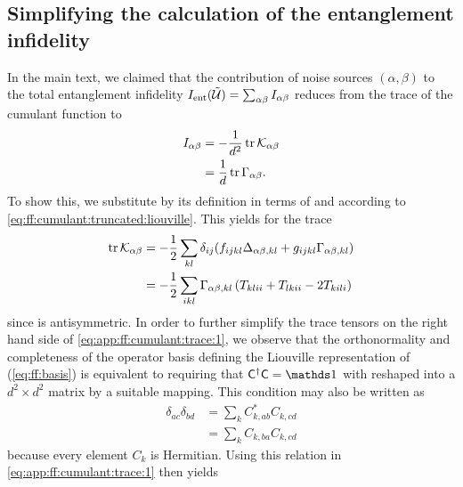 \subsection{Simplifying the calculation of the entanglement infidelity}\label{subsec:app:ff:derivations:fidelity}
In the main text, we claimed that the contribution of noise sources $(\alpha,\beta)$ to the total entanglement infidelity $I_{\mathrm{ent}}(\mathcal{\tilde{U}}) = \sum_{\alpha\beta}I_{\alpha\beta}$ reduces from the trace of the cumulant function \cumulantfun to
\begin{align}
    I_{\alpha\beta} &= -\frac{1}{d^2}\tr\mathcal{K}_{\alpha\beta} \label{eq:app:ff:infid} \\
                         &= \frac{1}{d}\tr\Gamma_{\alpha\beta}.
\end{align}
To show this, we substitute \cumulantfun by its definition in terms of \freqshifts and \decayamps according to \cref{eq:ff:cumulant:truncated:liouville}.
This yields for the trace
\begin{equation}\label{eq:app:ff:cumulant:trace:1}
    \begin{split}
        \tr\mathcal{K}_{\alpha\beta} &= -\frac{1}{2}\sum_{kl}\delta_{ij}(f_{ijkl}\Delta_{\alpha\beta,kl} + g_{ijkl}\Gamma_{\alpha\beta,kl}) \\
                                      &= -\frac{1}{2}\sum_{ikl}\Gamma_{\alpha\beta,kl}\left(T_{klii} + T_{lkii} - 2 T_{kili}\right)
    \end{split}
\end{equation}
since \freqshifts is antisymmetric.
In order to further simplify the trace tensors on the right hand side of \cref{eq:app:ff:cumulant:trace:1}, we observe that the orthonormality and completeness of the operator basis \basis defining the Liouville representation of \cumulantfun (\cf \cref{eq:ff:basis}) is equivalent to requiring that $\basis\adjoint\basis = \eye$ with \basis reshaped into a $d^2\times d^2$ matrix by a suitable mapping.
This condition may also be written as
\begin{equation}\label{eq:ff:basis:identity}
\begin{split}
    \delta_{ac}\delta_{bd} &= \sum_{k} C^\ast_{k,ab} C_{k,cd} \\
                           &= \sum_{k} C_{k,ba} C_{k,cd}
\end{split}
\end{equation}
because every element $C_k$ is Hermitian.
Using this relation in \cref{eq:app:ff:cumulant:trace:1} then yields
